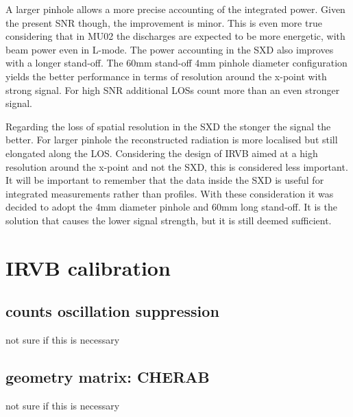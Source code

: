 A larger pinhole allows a more precise accounting of the integrated power. Given the present SNR though, the improvement is minor. This is even more true considering that in MU02 the discharges are expected to be more energetic, with beam power even in L-mode. The power accounting in the SXD also improves with a longer stand-off.
The 60mm stand-off 4mm pinhole diameter configuration yields the better performance in terms of resolution around the x-point with strong signal. For high SNR additional LOSs count more than an even stronger signal.

Regarding the loss of spatial resolution in the SXD the stonger the signal the better. For larger pinhole the reconstructed radiation is more localised but still elongated along the LOS. Considering the design of IRVB aimed at a high resolution around the x-point and not the SXD, this is considered less important. It will be important to remember that the data inside the SXD is useful for integrated measurements rather than profiles.
With these consideration it was decided to adopt the 4mm diameter pinhole and 60mm long stand-off. It is the solution that causes the lower signal strength, but it is still deemed sufficient.

\section{IRVB calibration}\label{IRVBcalibration}


\subsection{counts oscillation suppression}
not sure if this is necessary
\subsection{geometry matrix: CHERAB}
not sure if this is necessary